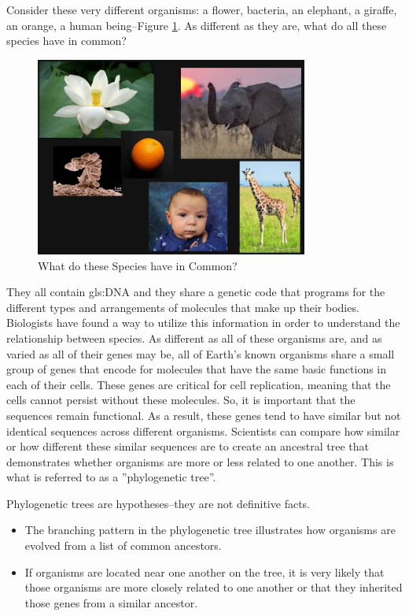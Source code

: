 \documentclass[]{article}
\begin{document}
Consider these very different organisms: a flower, bacteria, an elephant, a giraffe, an orange, a human being--Figure \ref{fig:WhatDoTheseSpeciesHaveInCommon}.
As different as they are, what do all these species have in common?
\begin{figure}[H]
	\begin{center}
		\caption{What do these Species have in Common?}\label{fig:WhatDoTheseSpeciesHaveInCommon}
		\includegraphics[width=0.8\textwidth]{WhatDoTheseSpeciesHaveInCommon}
	\end{center}
\end{figure}
They all contain \gls{gls:DNA}
and they share a genetic code
that programs for the different types
and arrangements of molecules
that make up their bodies.
Biologists have found a way
to utilize this information
in order to understand
the relationship between species.
As different as
all of these organisms are,
and as varied as
all of their genes may be,
all of Earth's known organisms
share a small group of genes
that encode for molecules
that have the same basic functions
in each of their cells.
These genes are critical
for cell replication,
meaning that the cells cannot persist
without these molecules.
So, it is important that
the sequences remain functional.
As a result, these genes tend to have
similar but not identical sequences
across different organisms.
Scientists can compare
how similar or how different
these similar sequences are
to create an ancestral tree
that demonstrates whether organisms
are more or less related to one another.
This is what is referred to
as a ''phylogenetic tree''.

Phylogenetic trees are hypotheses--they are not definitive facts.
\begin{itemize}
	\item The branching pattern
	in the phylogenetic tree
	illustrates how organisms are evolved
	from a list of common ancestors.
	
	\item If organisms are located
	near one another on the tree,
	it is very likely that those organisms
	are more closely related to one another
	or that they inherited those genes
	from a similar ancestor.
\end{itemize}
\end{document}
